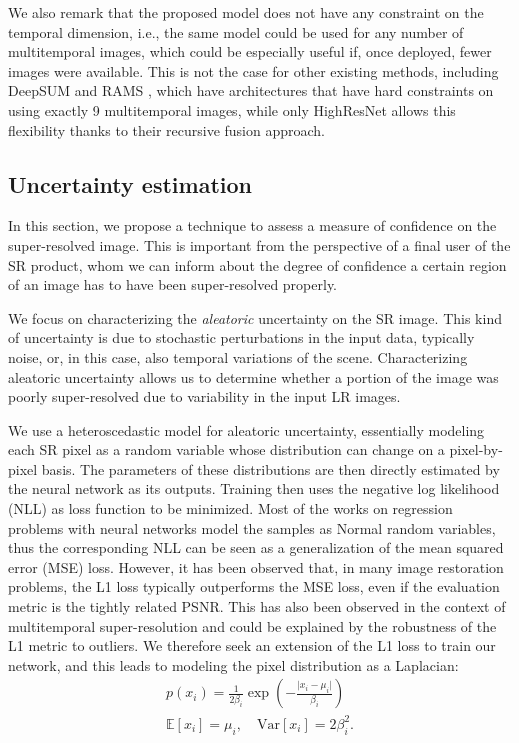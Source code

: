 \documentclass[journal]{IEEEtran}
\begin{document}
We also remark that the proposed model does not have any constraint on the temporal dimension, i.e., the same model could be used for any number of multitemporal images, which could be especially useful if, once deployed, fewer images were available. This is not the case for other existing methods, including DeepSUM \cite{molini2019deepsum} and RAMS \cite{salvetti2020multi}, which have architectures that have hard constraints on using exactly 9 multitemporal images, while only HighResNet \cite{rarefin2020multi} allows this flexibility thanks to their recursive fusion approach.


\subsection{Uncertainty estimation}

In this section, we propose a technique to assess a measure of confidence on the super-resolved image. This is important from the perspective of a final user of the SR product, whom we can inform about the degree of confidence a certain region of an image has to have been super-resolved properly.

We focus on characterizing the \textit{aleatoric} uncertainty \cite{kendall2017uncertainties} on the SR image. This kind of uncertainty is due to stochastic perturbations in the input data, typically noise, or, in this case, also temporal variations of the scene. Characterizing aleatoric uncertainty allows us to determine whether a portion of the image was poorly super-resolved due to variability in the input LR images. 

We use a heteroscedastic model for aleatoric uncertainty, essentially modeling each SR pixel as a random variable whose distribution can change on a pixel-by-pixel basis. The parameters of these distributions are then directly estimated by the neural network as its outputs. Training then uses the negative log likelihood (NLL) as loss function to be minimized. 
Most of the works on regression problems with neural networks \cite{kendall2018multi} model the samples as Normal random variables, thus the corresponding NLL can be seen as a generalization of the mean squared error (MSE) loss. However, it has been observed \cite{gallo2017loss} that, in many image restoration problems, the L1 loss typically outperforms the MSE loss, even if the evaluation metric is the tightly related PSNR. This has also been observed in the context of multitemporal super-resolution \cite{salvetti2020multi} and could be explained by the robustness of the L1 metric to outliers. We therefore seek an extension of the L1 loss to train our network, and this leads to modeling the pixel distribution as a Laplacian:
\begin{align*}
    p(x_i) = \frac{1}{2\beta_i}\exp\left( -\frac{\vert x_i-\mu_i \vert}{\beta_i} \right) \\
    \mathbb{E}\left[ x_i \right] = \mu_i, \quad \mathrm{Var}\left[ x_i \right] = 2\beta_i^2.
\end{align*}
\end{document}
